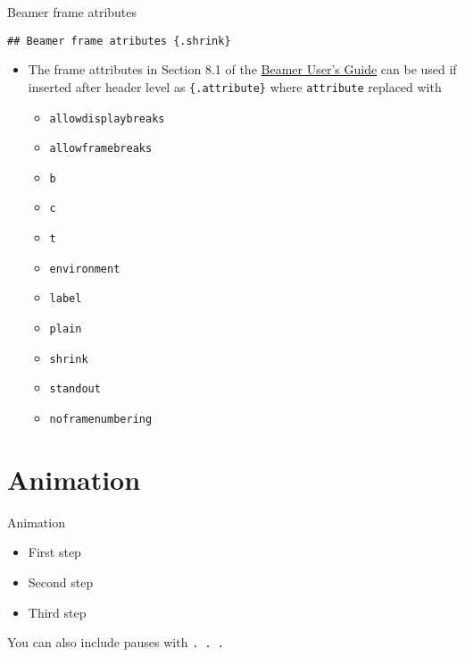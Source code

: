 \documentclass[10pt,aspectratio=169]{beamer}
\begin{document}
\begin{frame}{Beamer frame atributes}

\begin{verbatim}
## Beamer frame atributes {.shrink}
\end{verbatim}

\begin{itemize}
\item
  The frame attributes in Section 8.1 of the
  \href{http://mirror.aarnet.edu.au/pub/CTAN/macros/latex/contrib/beamer/doc/beameruserguide.pdf}{Beamer
  User's Guide} can be used if inserted after header level as
  \texttt{\{.attribute\}} where \texttt{attribute} replaced with

  \begin{itemize}
  \item
    \texttt{allowdisplaybreaks}
  \item
    \texttt{allowframebreaks}
  \item
    \texttt{b}
  \item
    \texttt{c}
  \item
    \texttt{t}
  \item
    \texttt{environment}
  \item
    \texttt{label}
  \item
    \texttt{plain}
  \item
    \texttt{shrink}
  \item
    \texttt{standout}
  \item
    \texttt{noframenumbering}
  \end{itemize}
\end{itemize}

\end{frame}


\section{Animation}

\begin{frame}[fragile]{Animation}

\begin{itemize}[<+->]
\item
  First step
\item
  Second step
\item
  Third step
\end{itemize}

\pause

You can also include pauses with \texttt{.\ .\ .}

\end{frame}
\end{document}
